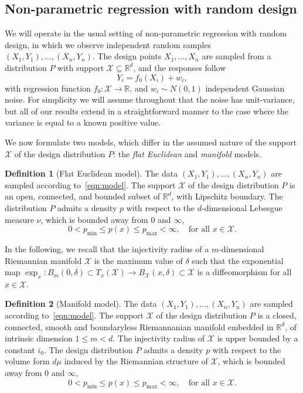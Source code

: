 \documentclass{article}
\newcommand{\Reals}{\mathbb{R}}
\newcommand{\1}{\mathbf{1}}
\newcommand{\Rd}{\Reals^d}
\newcommand{\mc}[1]{\mathcal{#1}}
\theoremstyle{alden}
\theoremstyle{aldenthm}
\theoremstyle{definition}
\newtheorem{definition}{Definition}[section]
\theoremstyle{remark}
\begin{document}
\subsection{Non-parametric regression with random design}
\label{sec:regression_laplacian_eigenmaps}

We will operate in the usual setting of non-parametric regression with random design, in which we observe independent random samples $(X_1,Y_1),\ldots,(X_n,Y_n)$. The design points $X_1,\ldots,X_n$ are sampled from a distribution $P$ with support $\mc{X} \subseteq \Rd$, and the responses follow
\begin{equation}
\label{eqn:model}
Y_i = f_0(X_i) + w_i,
\end{equation}
with regression function $f_0: \mc{X} \to \Reals$, and $w_i \sim N(0,1)$ independent Gaussian noise. For simplicity we will assume throughout that the noise has unit-variance, but all of our results extend in a straightforward manner to the case where the variance is equal to a known positive value. 

We now formulate two models, which differ in the assumed nature of the support $\mc{X}$ of the design distribution $P$: the \emph{flat Euclidean} and \emph{manifold} models.

\begin{definition}[Flat Euclidean model]
	\label{def:model_flat_euclidean}
	The data $(X_1,Y_1),\ldots,(X_n,Y_n)$ are sampled according to~\eqref{eqn:model}. The support $\mc{X}$ of the design distribution $P$ is an open, connected, and bounded subset of $\Rd$, with Lipschitz boundary. The distribution $P$ admits a density $p$ with respect to the $d$-dimensional Lebesgue measure $\nu$, which is bounded away from $0$ and $\infty$,
	\begin{equation*}
	0 < p_{\min} \leq p(x) \leq p_{\max} < \infty, \quad \textrm{for all $x \in \mc{X}$.}
	\end{equation*}
\end{definition}

In the following, we recall that the injectivity radius of a $m$-dimensional Riemannian manifold $\mc{X}$ is the maximum value of $\delta$ such that the exponential map $\exp_x: B_m(0,\delta) \subset T_x(\mc{X}) \to B_{\mc{X}}(x,\delta) \subset \mc{X}$ is a diffeomorphism for all $x \in \mc{X}$.
\begin{definition}[Manifold model]
	\label{def:model_manifold}
	The data $(X_1,Y_1),\ldots,(X_n,Y_n)$ are sampled according to~\eqref{eqn:model}. 
	The support $\mc{X}$ of the design distribution $P$ is a closed, connected, smooth and boundaryless Riemannanian manifold embedded in $\Rd$, of intrinsic dimension $1 \leq m < d$. The injectivity radius of $\mc{X}$ is upper bounded by a constant $i_0$. The design distribution $P$ admits a density $p$ with respect to the volume form $d\mu$ induced by the Riemannian structure of $\mc{X}$, which is bounded away from $0$ and $\infty$,
	\begin{equation*}
	0 < p_{\min} \leq p(x) \leq p_{\max} < \infty, \quad \textrm{for all $x \in \mc{X}$.}
	\end{equation*}
\end{definition}
\end{document}
